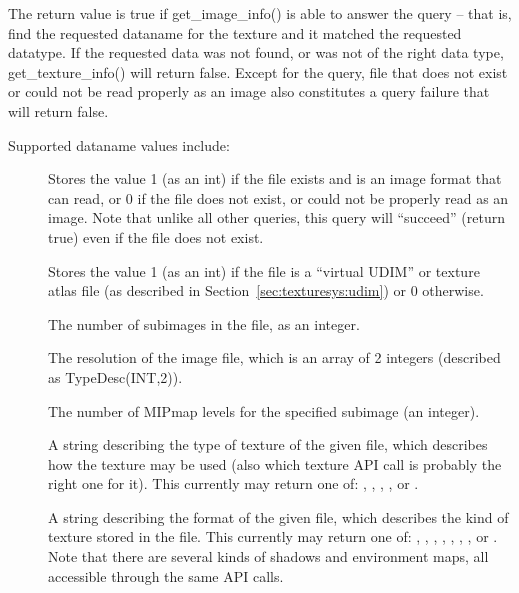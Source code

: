 The return value is {\cf true} if {\cf get_image_info()} is able to answer
the query -- that is, find the requested {\cf dataname} for the texture and
it matched the requested {\cf datatype}.  If the requested data was not
found, or was not of the right data type, {\cf get_texture_info()} will
return {\cf false}. Except for the  query, file that does not
exist or could not be read properly as an image also constitutes a query
failure that will return {\cf false}.

Supported {\cf dataname} values include:

\begin{description}
\item[\spc] \spc
\vspace{-12pt} 

\item[\rm {}] Stores the value 1 (as an {\cf int}) if the file
exists and is an image format that \product can read, or 0 if the file
does not exist, or could not be properly read as an image. Note that
unlike all other queries, this query will ``succeed'' (return {\cf true})
even if the file does not exist.

\item[\rm {}] Stores the value 1 (as an {\cf int}) if the file
is a ``virtual UDIM'' or texture atlas file (as described in
Section~\ref{sec:texturesys:udim}) or 0 otherwise.

\item[\rm {}] The number of subimages in the file, as an integer.

\item[\rm {}] The resolution of the image file, which
is an array of 2 integers (described as {\cf TypeDesc(INT,2)}).

\item[\rm {}] The number of MIPmap levels for the specified
subimage (an integer).

\item[\rm {}] A string describing the type of texture
of the given file, which describes how the texture may be used (also
which texture API call is probably the right one for it).
This currently may return one of: , ,
, , 
or .

\item[\rm {}] A string describing the format of the
given file, which describes the kind of texture stored in the file.
This currently may return one of: , ,
, , , , , or .
Note that there are several kinds of shadows and environment maps,
all accessible through the same API calls.


\end{description}
